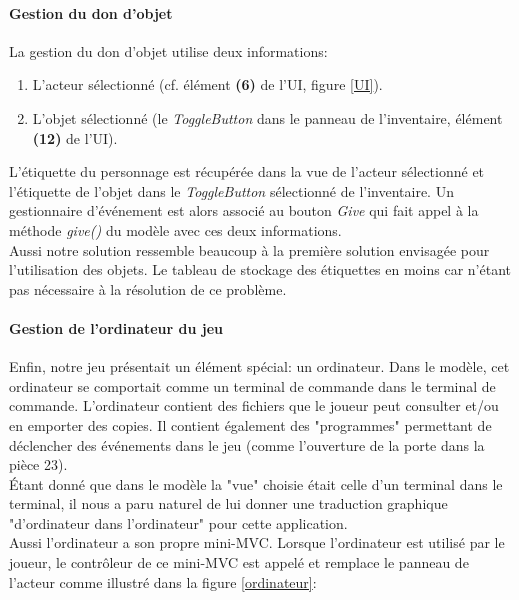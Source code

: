 \documentclass[./standalone.tex]{subfiles}
\begin{document}
\paragraph{Gestion du don d'objet\\}

La gestion du don d'objet utilise deux informations:
\begin{enumerate}
	\item L'acteur sélectionné (cf. élément \textbf{(6)} de l'UI, figure \ref{UI}).
	\item L'objet sélectionné (le \textit{ToggleButton} dans le panneau de l'inventaire, élément \textbf{(12)} de l'UI).
\end{enumerate}

L'étiquette du personnage est récupérée dans la vue de l'acteur sélectionné et l'étiquette de l'objet dans le \textit{ToggleButton} sélectionné de l'inventaire. Un gestionnaire d'événement est alors associé au bouton \textit{Give} qui fait appel à la méthode \textit{give()} du modèle avec ces deux informations.\\

Aussi notre solution ressemble beaucoup à la première solution envisagée pour l'utilisation des objets. Le tableau de stockage des étiquettes en moins car n'étant pas nécessaire à la résolution de ce problème.
\newpage

\paragraph{Gestion de l'ordinateur du jeu\\}
Enfin, notre jeu présentait un élément spécial: un ordinateur. Dans le modèle, cet ordinateur se comportait comme un terminal de commande dans le terminal de commande. L'ordinateur contient des fichiers que le joueur peut consulter et/ou en emporter des copies. Il contient également des "programmes" permettant de déclencher des événements dans le jeu (comme l'ouverture de la porte dans la pièce 23).\\

Étant donné que dans le modèle la "vue" choisie était celle d'un terminal dans le terminal, il nous a paru naturel de lui donner une traduction graphique "d'ordinateur dans l'ordinateur" pour cette application.\\

Aussi l'ordinateur a son propre mini-MVC. Lorsque l'ordinateur est utilisé par le joueur, le contrôleur de ce mini-MVC est appelé et remplace le panneau de l'acteur comme illustré dans la figure \ref{ordinateur}:
\end{document}
